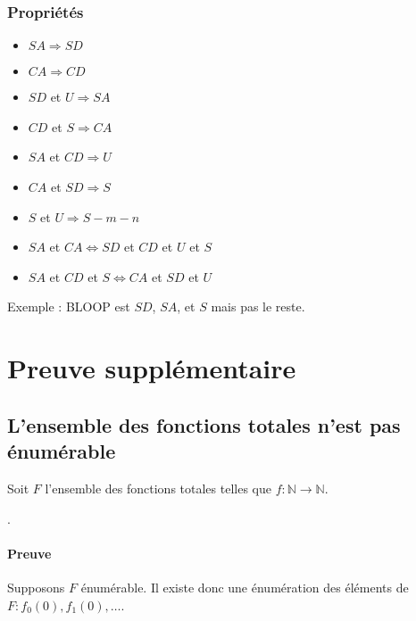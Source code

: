 \subsection{Propriétés}

\begin{itemize}
\item $SA \Rightarrow SD$
\item $CA \Rightarrow CD$
\item $SD$ et $U \Rightarrow SA$
\item $CD$ et $S \Rightarrow CA$
\item $SA$ et $CD \Rightarrow U$
\item $CA$ et $SD \Rightarrow S$
\item $S$ et $U \Rightarrow S-m-n$
\item $SA$ et $CA \Leftrightarrow SD$ et $CD$ et $U$ et $S$
\item $SA$ et $CD$ et $S \Leftrightarrow CA$ et $SD$ et $U$
\end{itemize}

Exemple : BLOOP est $SD$, $SA$, et $S$ mais pas le reste.

\chapter{Preuve supplémentaire}

\section{L'ensemble des fonctions totales n'est pas énumérable}\label{sec:ensembleF}

Soit $F$ l'ensemble des fonctions totales telles que $f : \mathbb{N} \rightarrow \mathbb{N}$.

.

\subsubsection*{Preuve}

Supposons $F$ énumérable. Il existe donc une énumération des éléments de $F : f_0(0), f_1(0), \ldots$.

